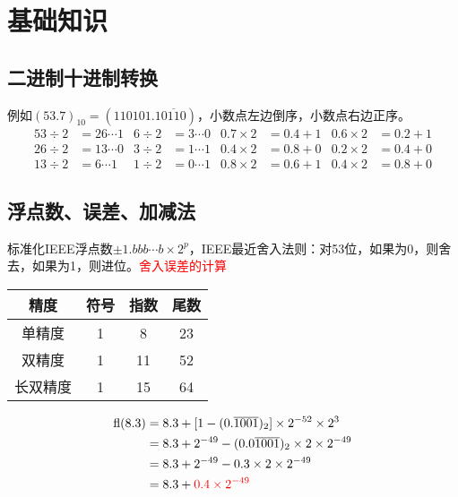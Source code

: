 \documentclass[twocolumn]{article}
\begin{document}
\footnotesize

\section{基础知识}

\subsection{二进制十进制转换}
例如$(53.7)_{10}=(110101.1\overline{0110})$，小数点左边倒序，小数点右边正序。
\begin{align*}
    53 \div 2 & = 26 \cdots 1 & 6  \div 2 & = 3  \cdots 0 & 0.7 \times 2 & =0.4 + 1 & 0.6 \times 2 & =0.2 + 1 \\
    26 \div 2 & = 13 \cdots 0 & 3  \div 2 & = 1  \cdots 1 & 0.4 \times 2 & =0.8 + 0 & 0.2 \times 2 & =0.4 + 0 \\
    13 \div 2 & = 6  \cdots 1 & 1  \div 2 & = 0  \cdots 1 & 0.8 \times 2 & =0.6 + 1 & 0.4 \times 2 & =0.8 + 0
\end{align*}

\subsection{浮点数、误差、加减法}
标准化IEEE浮点数$\pm 1.bbb\cdots b \times 2^p$，IEEE最近舍入法则：对53位，如果为0，则舍去，如果为1，则进位。\textcolor{red}{舍入误差的计算}

\noindent
\begin{minipage}{0.45\linewidth}
    \begin{center}
        \begin{tabular}{cccc}
            \toprule
            精度     & 符号 & 指数 & 尾数 \\
            \hline
            单精度   & 1    & 8    & 23   \\
            双精度   & 1    & 11   & 52   \\
            长双精度 & 1    & 15   & 64   \\
            \bottomrule
        \end{tabular}
    \end{center}
\end{minipage}
\begin{minipage}{0.5\linewidth}
    \begin{align*}
        \mathrm{fl}(8.3)&=8.3+[1-(0.\overline{1001})_2]\times 2^{-52}\times 2^3\\
        &=8.3+2^{-49}-(0.0\overline{1001})_2\times 2\times 2^{-49}\\
        &=8.3+2^{-49}-0.3\times 2\times 2^{-49}\\
        &=8.3+\textcolor{red}{0.4\times 2^{-49}}
    \end{align*}
\end{minipage}
\end{document}
